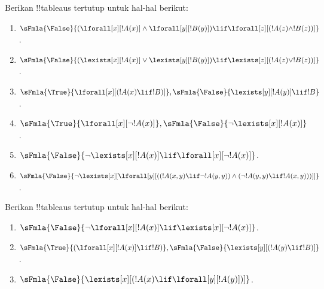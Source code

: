 \documentclass[../../../include/open-logic-section]{subfiles}
\begin{document}
\begin{prob}
Berikan !!{tableau}s tertutup untuk hal-hal berikut:
\begin{enumerate}
\item $\sFmla{\False}{(\lforall[x][!A(x)] \land \lforall[y][!B(y)])
\lif \lforall[z][(!A(z) \land !B(z))]}$.
\item $\sFmla{\False}{(\lexists[x][!A(x)] \lor \lexists[y][!B(y)])
\lif \lexists[z][(!A(z) \lor !B(z))]}$.
\item $\sFmla{\True}{\lforall[x][(!A(x) \lif !B)]},
\sFmla{\False}{\lexists[y][!A(y)] \lif !B}$.
\item $\sFmla{\True}{\lforall[x][\lnot !A(x)]},
\sFmla{\False}{\lnot\lexists[x][!A(x)]}$.
\item $\sFmla{\False}{\lnot\lexists[x][!A(x)] \lif \lforall[x][\lnot
!A(x)]}$.
\item $\sFmla{\False}{\lnot\lexists[x][\lforall[y][((!A(x,y) \lif
\lnot !A(y,y)) \land (\lnot !A(y,y) \lif !A(x,y)))]]}$.
\end{enumerate}
\end{prob}

\begin{prob}
Berikan !!{tableau}s tertutup untuk hal-hal berikut:
\begin{enumerate}
\item $\sFmla{\False}{\lnot\lforall[x][!A(x)] \lif \lexists[x][\lnot!A(x)]}$.
\item $\sFmla{\True}{(\lforall[x][!A(x)] \lif !B)}, \sFmla{\False}{\lexists[y][(!A(y) \lif !B)]}$.
\item $\sFmla{\False}{\lexists[x][(!A(x) \lif \lforall[y][!A(y)])]}$.
\end{enumerate}
\end{prob}
\end{document}
